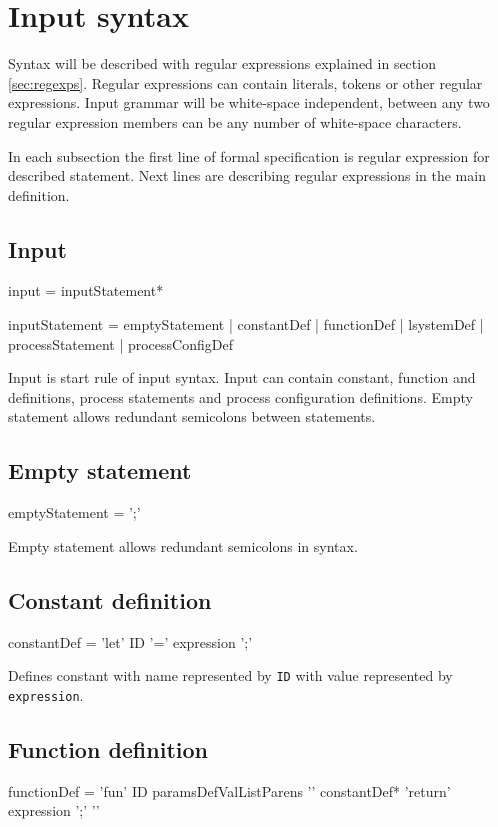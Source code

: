 \section{Input syntax}

Syntax will be described with regular expressions explained in section \ref{sec:regexps}.
Regular expressions can contain literals, tokens or other regular expressions.
Input grammar will be white-space independent, between any two regular expression members can be any number of white-space characters.

In each subsection the first line of formal specification is regular expression for described statement.
Next lines are describing regular expressions in the main definition.


\subsection{Input}
\begin{Grammar}
input = inputStatement*

inputStatement = emptyStatement
	| constantDef
	| functionDef
	| lsystemDef
	| processStatement
	| processConfigDef
\end{Grammar}

Input is start rule of input syntax.
Input can contain constant, function and \lsystem definitions, process statements and process configuration definitions.
Empty statement allows redundant semicolons between statements.


\subsection{Empty statement}

\begin{Grammar}
emptyStatement = ';'
\end{Grammar}

Empty statement allows redundant semicolons in syntax.


\subsection{Constant definition}
\begin{Grammar}
constantDef = 'let' ID '=' expression ';'
\end{Grammar}

Defines constant with name represented by \texttt{ID} with value represented by \texttt{expression}.


\subsection{Function definition}
\begin{Grammar}
functionDef = 'fun' ID paramsDefValListParens
	'{' constantDef* 'return' expression ';' '}'
\end{Grammar}

